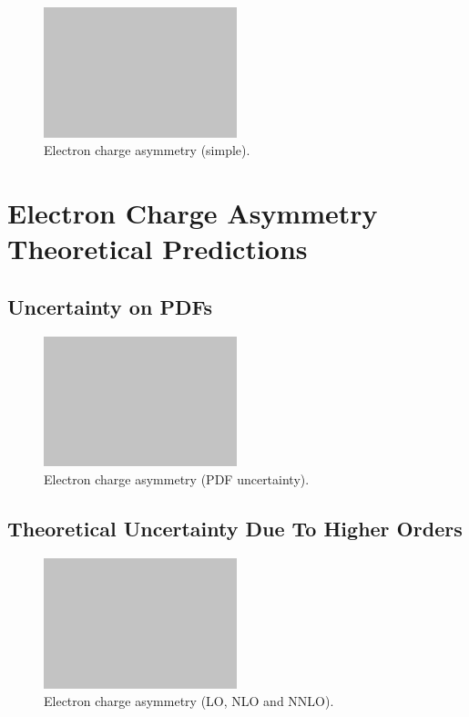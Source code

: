 \begin{figure}[htb]
  \centering
  \includegraphics[width=0.5\textwidth]{placeholder}
  \caption{Electron charge asymmetry (simple).}
  \label{wbos:asym_simple}
\end{figure}

\section{Electron Charge Asymmetry Theoretical Predictions}

\subsection{Uncertainty on \acp{PDF}}

\begin{figure}[htb]
  \centering
  \includegraphics[width=0.5\textwidth]{placeholder}
  \caption{Electron charge asymmetry (PDF uncertainty).}
  \label{wbos:asym_pdfuncert}
\end{figure}

\subsection{Theoretical Uncertainty Due To Higher Orders}
\begin{figure}[htb]
  \centering
  \includegraphics[width=0.5\textwidth]{placeholder}
  \caption{Electron charge asymmetry (LO, NLO and NNLO).}
  \label{wbos:asym_NNLO}
\end{figure}


